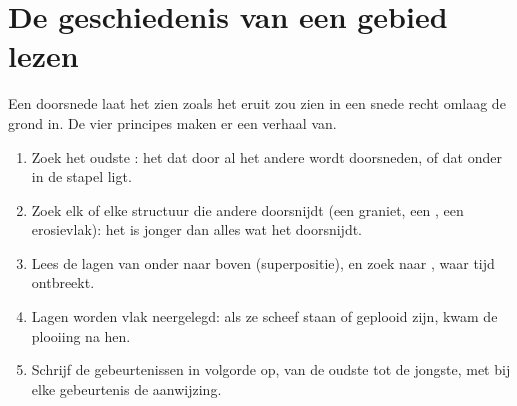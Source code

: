 \section{De geschiedenis van een gebied lezen}

Een doorsnede laat het  zien zoals het eruit zou zien in een snede
recht omlaag de grond in. De vier principes maken er een verhaal van.

\begin{method}\label{met:g7:geological-time:ordering}
\begin{enumerate}
  \item Zoek het oudste : het  dat door al het andere
        wordt doorsneden, of dat onder in de stapel ligt.
  \item Zoek elk  of elke structuur die andere doorsnijdt (een
        graniet, een , een erosievlak): het is jonger dan alles wat
        het doorsnijdt.
  \item Lees de lagen van onder naar boven (superpositie), en zoek naar
        , waar tijd ontbreekt.
  \item Lagen worden vlak neergelegd: als ze scheef staan of geplooid zijn,
        kwam de plooiing na hen.
  \item Schrijf de gebeurtenissen in volgorde op, van de oudste tot de
        jongste, met bij elke gebeurtenis de aanwijzing.
\end{enumerate}
\end{method}

